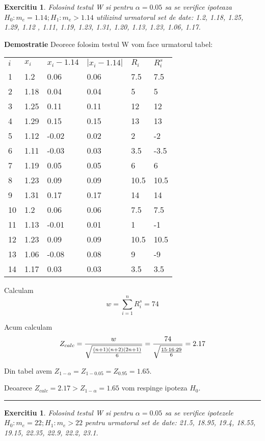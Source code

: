 \documentclass{article}
\newtheorem{exercise}[theorem]{Exercitiu}
\newenvironment{proof}[1][Proof]{\noindent\textbf{Demostratie} }{\ \rule{0.5em}{0.5em}}
\begin{document}
\begin{exercise}
Folosind testul W si pentru $\alpha =0.05$ sa se verifice ipoteaza $%
H_{0}:m_{e}=1.14;H_{1}:m_{e}>1.14$ utilizind urmatorul set de date: 1.2,
1.18, 1.25, 1.29, 1.12 , 1.11, 1.19, 1.23, 1.31, 1.20, 1.13, 1.23, 1.06,
1.17.
\end{exercise}

\begin{proof}
Deorece folosim testul W vom face urmatorul tabel:

\begin{tabular}{llllll}
$i$ & $x_{i}$ & $x_{i}-1.14$ & $\left\vert x_{i}-1.14\right\vert $ & $R_{i}$
& $R_{i}^{s}$ \\ 
1 & 1.2 & 0.06 & 0.06 & 7.5 & 7.5 \\ 
2 & 1.18 & 0.04 & 0.04 & 5 & 5 \\ 
3 & 1.25 & 0.11 & 0.11 & 12 & 12 \\ 
4 & 1.29 & 0.15 & 0.15 & 13 & 13 \\ 
5 & 1.12 & -0.02 & 0.02 & 2 & -2 \\ 
6 & 1.11 & -0.03 & 0.03 & 3.5 & -3.5 \\ 
7 & 1.19 & 0.05 & 0.05 & 6 & 6 \\ 
8 & 1.23 & 0.09 & 0.09 & 10.5 & 10.5 \\ 
9 & 1.31 & 0.17 & 0.17 & 14 & 14 \\ 
10 & 1.2 & 0.06 & 0.06 & 7.5 & 7.5 \\ 
11 & 1.13 & -0.01 & 0.01 & 1 & -1 \\ 
12 & 1.23 & 0.09 & 0.09 & 10.5 & 10.5 \\ 
13 & 1.06 & -0.08 & 0.08 & 9 & -9 \\ 
14 & 1.17 & 0.03 & 0.03 & 3.5 & 3.5%
\end{tabular}

Calculam%
\[
w=\sum_{i=1}^{n}R_{i}^{s}=74
\]

Acum calculam 
\[
Z_{calc}=\frac{w}{\sqrt{\frac{(n+1)(n+2)(2n+1)}{6}}}=\frac{74}{\sqrt{\frac{%
15\cdot 16\cdot 29}{6}}}=2.17
\]

Din tabel avem $Z_{1-\alpha }=Z_{1-0.05}=Z_{0.95}=1.65$.

Deoarece $Z_{calc}=2.17>Z_{1-\alpha }=1.65$ vom respinge ipoteza $H_{0}$.
\end{proof}

\begin{exercise}
Folosind testul W si pentru $\alpha =0.05$ sa se verifice ipotezele $%
H_{0}:m_{e}=22;H_{1}:m_{e}>22$ pentru urmatorul set de date: 21.5, 18.95,
19.4, 18.55, 19.15, 22.35, 22.9, 22.2, 23.1.
\end{exercise}
\end{document}
